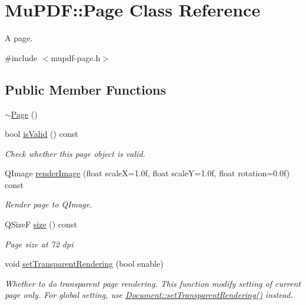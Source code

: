 \hypertarget{class_mu_p_d_f_1_1_page}{\section{Mu\-P\-D\-F\-:\-:Page Class Reference}
\label{class_mu_p_d_f_1_1_page}
}


A page.  




{\ttfamily \#include $<$mupdf-\/page.\-h$>$}

\subsection*{Public Member Functions}
\begin{DoxyCompactItemize}
\item 
\hyperlink{class_mu_p_d_f_1_1_page_af319e925b5460b6b09a40aacd1d68347}{$\sim$\-Page} ()
\item 
bool \hyperlink{class_mu_p_d_f_1_1_page_a1f60d3a284731ac220a8717eb6a93167}{is\-Valid} () const 
\begin{DoxyCompactList}\small\item\em Check whether this page object is valid. \end{DoxyCompactList}\item 
Q\-Image \hyperlink{class_mu_p_d_f_1_1_page_abdd1b94b296ea263190b53640168a77b}{render\-Image} (float scale\-X=1.\-0f, float scale\-Y=1.\-0f, float rotation=0.\-0f) const 
\begin{DoxyCompactList}\small\item\em Render page to Q\-Image. \end{DoxyCompactList}\item 
Q\-Size\-F \hyperlink{class_mu_p_d_f_1_1_page_a79b644e18279956b52d76aa8a492f62b}{size} () const 
\begin{DoxyCompactList}\small\item\em Page size at 72 dpi \end{DoxyCompactList}\item 
void \hyperlink{class_mu_p_d_f_1_1_page_ac6768d64b88de1ccdd1fa0abb2724db0}{set\-Transparent\-Rendering} (bool enable)
\begin{DoxyCompactList}\small\item\em Whether to do transparent page rendering. This function modify setting of current page only. For global setting, use \hyperlink{class_mu_p_d_f_1_1_document_a8df89d0517437182406e2ba766402a3c}{Document\-::set\-Transparent\-Rendering()} instead. \end{DoxyCompactList}\item 

\end{DoxyCompactItemize}
